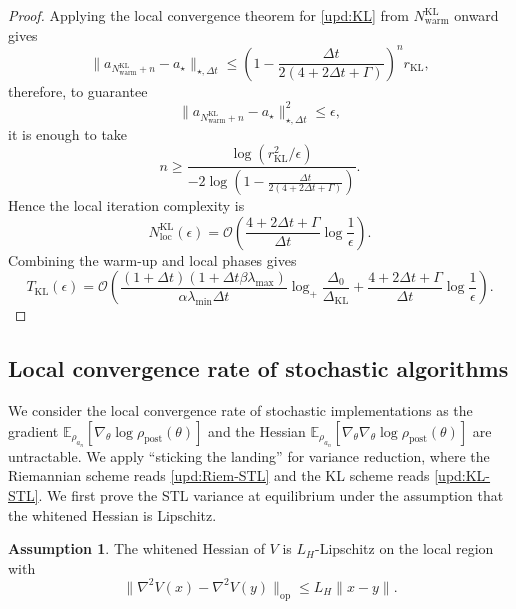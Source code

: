 \documentclass[11pt]{article}
\theoremstyle{plain}
\theoremstyle{definition}
\newtheorem{assumption}[theorem]{Assumption}
\theoremstyle{remark}
\newcommand{\E}{\mathbb{E}}
\newcommand{\post}{\mathrm{post}}
\begin{document}
\begin{proof}
    Applying the local convergence theorem for \eqref{upd:KL} from $N_\mathrm{warm}^\mathrm{KL}$ onward gives
    \[
        \|a_{N_\mathrm{warm}^\mathrm{KL}+n}-a_\star\|_{\star,\Delta t}
        \leq
        \left(
            1-\frac{\Delta t}{2(4+2\Delta t+\Gamma)}
        \right)^n
        r_\mathrm{KL},
    \]
    therefore, to guarantee
    \[
        \|a_{N_\mathrm{warm}^\mathrm{KL}+n}-a_\star\|_{\star,\Delta t}^2
        \leq
        \epsilon,
    \]
    it is enough to take
    \[
        n
        \geq
        \frac{
            \log(r_\mathrm{KL}^2/\epsilon)
        }{
            -2\log\left(
                1-\frac{\Delta t}{2(4+2\Delta t+\Gamma)}
            \right)
        }.
    \]
    Hence the local iteration complexity is
    \[
        N_\mathrm{loc}^\mathrm{KL}(\epsilon)
        =
        \mathcal O\left(
            \frac{4+2\Delta t+\Gamma}{\Delta t}
            \log\frac{1}{\epsilon}
        \right).
    \]
    Combining the warm-up and local phases gives
    \[
        T_\mathrm{KL}(\epsilon)
        =
        \mathcal O\left(
            \frac{(1+\Delta t)(1+\Delta t\beta\lambda_{\max})}
            {\alpha\lambda_{\min}\Delta t}
            \log_+
            \frac{\Delta_0}{\Delta_\mathrm{KL}}
            +
            \frac{4+2\Delta t+\Gamma}{\Delta t}
            \log\frac{1}{\epsilon}
        \right).
    \]
\end{proof}

\subsection{Local convergence rate of stochastic algorithms}

We consider the local convergence rate of stochastic implementations as the gradient $\E_{\rho_{a_n}} [\nabla_\theta \log \rho_\post (\theta)]$ and the Hessian $\E_{\rho_{a_n}} [\nabla_\theta \nabla_\theta \log \rho_\post (\theta)]$ are untractable. We apply ``sticking the landing'' \cite{roeder2017sticking} for variance reduction, where the Riemannian scheme reads \eqref{upd:Riem-STL} and the KL scheme reads \eqref{upd:KL-STL}. We first prove the STL variance at equilibrium under the assumption that the whitened Hessian is Lipschitz.

\begin{assumption}\label{assump:Hess-smooth}
    The whitened Hessian of $V$ is $L_H$-Lipschitz on the local region with 
    \begin{equation*}
        \| \nabla^2 V(x) - \nabla^2 V(y) \|_\mathrm{op} \leq L_H \|x - y\|.
    \end{equation*}
\end{assumption}
\end{document}
